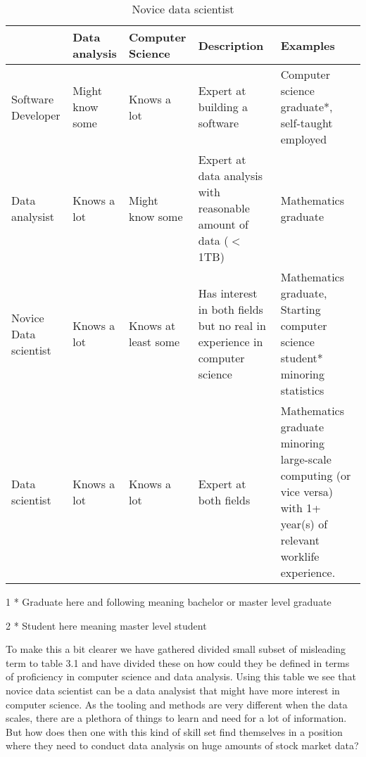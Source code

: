 \begin{table}[! htbp]\centering 
  \caption{Novice data scientist}
  \begin{threeparttable}
      \begin{tabular}{|p{2cm}|>{\centering\arraybackslash}p{1.5cm}|>{\centering\arraybackslash}p{1.8cm}|p{2.9cm}|p{3.6cm}|}
      \hline
      & Data analysis & Computer Science & Description & Examples \\ \hline
      Software Developer & Might know some & Knows a lot & Expert at building a software & Computer science graduate*, self-taught employed \\ \hline
      Data analysist & Knows a lot & Might know some & Expert at data analysis with reasonable amount of data ($<$ 1TB) & Mathematics graduate \\ \hline
      Novice Data scientist & Knows a lot & Knows at least some & Has interest in both fields but no real in experience in computer science & Mathematics graduate, Starting computer science student* minoring statistics \\ \hline
      Data scientist & Knows a lot & Knows a lot & Expert at both fields & Mathematics graduate minoring large-scale computing (or vice versa) with 1+ year(s) of relevant worklife experience. \\ \hline
      \end{tabular}
      \begin{tablenotes}\footnotesize
        \item[1] * Graduate here and following meaning bachelor or master level graduate
        \item[2] * Student here meaning master level student
    \end{tablenotes}
  \end{threeparttable}
\end{table}

To make this a bit clearer we have gathered divided small subset of misleading term to table 3.1 and have divided these on how could they be defined in terms of proficiency in computer science and data analysis.
Using this table we see that novice data scientist can be a data analysist that might have more interest in computer science.
As the tooling and methods are very different when the data scales, there are a plethora of things to learn and need for a lot of information.
But how does then one with this kind of skill set find themselves in a position where they need to conduct data analysis on huge amounts of stock market data?


